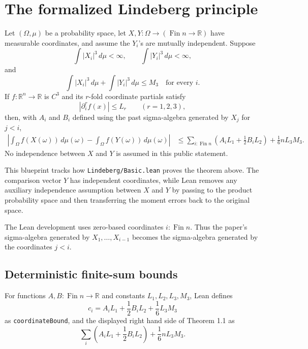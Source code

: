 \chapter{The formalized Lindeberg principle}

\begin{theorem}\label{thm:theorem-one-one}
\leanok
Let \((\Omega,\mu)\) be a probability space, let
\(X,Y:\Omega\to(\operatorname{Fin} n\to\mathbb{R})\) have measurable
coordinates, and assume the \(Y_i\)'s are mutually independent.  Suppose
\[
  \int |X_i|^3\,d\mu<\infty,\qquad
  \int |Y_i|^3\,d\mu<\infty,
\]
and
\[
  \int |X_i|^3\,d\mu+\int |Y_i|^3\,d\mu\le M_3
  \quad\text{for every } i.
\]
If \(f:\mathbb{R}^n\to\mathbb{R}\) is \(C^3\) and its \(r\)-fold coordinate
partials satisfy
\[
  |\partial_i^r f(x)|\le L_r
  \qquad (r=1,2,3),
\]
then, with \(A_i\) and \(B_i\) defined using the past sigma-algebra generated
by \(X_j\) for \(j<i\),
\[
\begin{aligned}
  \left|\int_\Omega f(X(\omega))\,d\mu(\omega)
  -\int_\Omega f(Y(\omega))\,d\mu(\omega)\right|
  &\le
  \sum_{i:\operatorname{Fin} n}
    \left(A_iL_1+\frac12B_iL_2\right)
  +\frac16 nL_3M_3 .
\end{aligned}
\]
No independence between \(X\) and \(Y\) is assumed in this public statement.
\end{theorem}

This blueprint tracks how \texttt{Lindeberg/Basic.lean} proves the theorem
above.  The comparison vector \(Y\) has independent coordinates, while Lean
removes any auxiliary independence assumption between \(X\) and \(Y\) by
passing to the product probability space and then transferring the moment
errors back to the original space.

The Lean development uses zero-based coordinates \(i : \operatorname{Fin} n\).
Thus the paper's sigma-algebra generated by \(X_1,\ldots,X_{i-1}\) becomes
the sigma-algebra generated by the coordinates \(j<i\).

\section{Deterministic finite-sum bounds}

\begin{definition}\label{def:deterministic-bounds}
\leanok
For functions \(A,B : \operatorname{Fin} n \to \mathbb{R}\) and constants
\(L_1,L_2,L_3,M_3\), Lean defines
\[
  c_i=A_iL_1+\frac12 B_iL_2+\frac16 L_3M_3
\]
as \texttt{coordinateBound}, and the displayed right hand side of Theorem 1.1
as
\[
  \sum_i \left(A_iL_1+\frac12 B_iL_2\right)
  + \frac16 nL_3M_3 .
\]
\end{definition}

